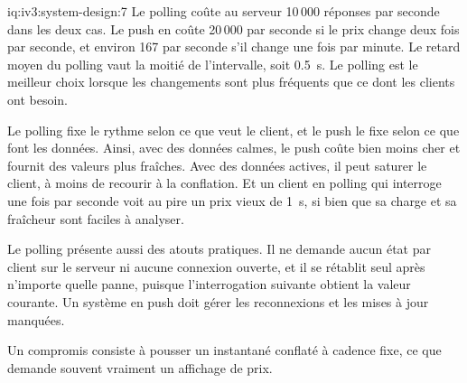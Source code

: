 \begin{solution}{iq:iv3:system-design:7}
Le polling coûte au serveur 10\,000 réponses par seconde dans les deux cas. Le push en coûte 20\,000 par seconde si le prix change deux fois par seconde, et environ 167 par seconde s'il change une fois par minute. Le retard moyen du polling vaut la moitié de l'intervalle, soit 0.5~s. Le polling est le meilleur choix lorsque les changements sont plus fréquents que ce dont les clients ont besoin.

Le polling fixe le rythme selon ce que veut le client, et le push le fixe selon ce que font les données. Ainsi, avec des données calmes, le push coûte bien moins cher et fournit des valeurs plus fraîches. Avec des données actives, il peut saturer le client, à moins de recourir à la conflation. Et un client en polling qui interroge une fois par seconde voit au pire un prix vieux de 1~s, si bien que sa charge et sa fraîcheur sont faciles à analyser.

Le polling présente aussi des atouts pratiques. Il ne demande aucun état par client sur le serveur ni aucune connexion ouverte, et il se rétablit seul après n'importe quelle panne, puisque l'interrogation suivante obtient la valeur courante. Un système en push doit gérer les reconnexions et les mises à jour manquées.

Un compromis consiste à pousser un instantané conflaté à cadence fixe, ce que demande souvent vraiment un affichage de prix.

\end{solution}

